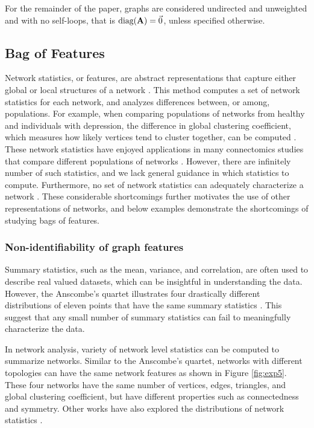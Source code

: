 For the remainder of the paper, graphs are considered undirected and unweighted and with no self-loops, that is $\text{diag}(\operatorname{\mathbf{A}}) = \Vec{0}$, unless specified otherwise.

\subsection{Bag of Features}\label{sec:bag-of-features}
Network statistics, or features, are abstract representations that capture either global or local structures of a network \cite{priebe_coppersmith_rukhin_2010,mhembere2013computing}. This method computes a set of network statistics for each network, and analyzes differences between, or among, populations. For example, when comparing populations of networks from healthy and individuals with depression, the difference in global clustering coefficient, which measures how likely vertices tend to cluster together, can be computed \cite{Bullmore2009-yj}. These network statistics have enjoyed applications in many connectomics studies that compare different populations of networks \cite{bullmore2011brain, ghoshdastidar2017two}. However, there are infinitely number of such statistics, and we lack general guidance in which statistics to compute. Furthermore, no set of network statistics can adequately characterize a network \cite{chen2018same,matejka2017same}. These considerable shortcomings further motivates the use of other representations of networks, and below examples demonstrate the shortcomings of studying bags of features.

\subsubsection{Non-identifiability of graph features}
Summary statistics, such as the mean, variance, and correlation, are often used to describe real valued datasets, which can be insightful in understanding the data. However, the Anscombe's quartet illustrates four drastically different distributions of eleven points that have the same summary statistics \cite{anscombe1973graphs}. This suggest that any small number of summary statistics can fail to meaningfully characterize the data. 

In network analysis, variety of network level statistics can be computed to summarize networks. Similar to the Anscombe's quartet, networks with different topologies can have the same network features as shown in Figure \ref{fig:exp5}. These four networks have the same number of vertices, edges, triangles, and global clustering coefficient, but have different properties such as connectedness and symmetry. Other works have also explored the distributions of network statistics \cite{chen2018same,matejka2017same}. 

